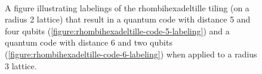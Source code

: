 \documentclass{amsbook}
\theoremstyle{plain}
\theoremstyle{definition}
\theoremstyle{remark}
\begin{document}
\begin{figure}
\\
\caption{
\label{figure:rhombihexadeltille-code-56-labelings}
A figure illustrating labelings of the rhombihexadeltille tiling (on a radius 2 lattice) that result in a quantum code with distance 5 and four qubits (\ref{figure:rhombihexadeltille-code-5-labeling}) and a quantum code with distance 6 and two qubits (\ref{figure:rhombihexadeltille-code-6-labeling}) when applied to a radius 3 lattice.
}
\end{figure}
\end{document}
